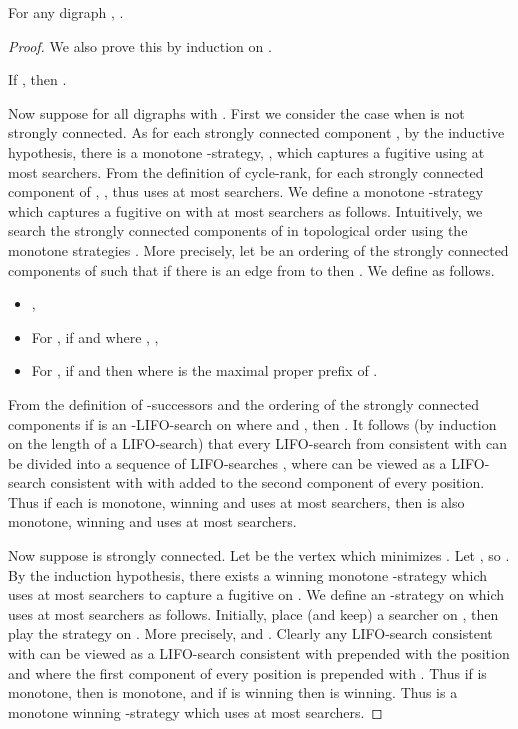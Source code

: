 \documentclass{llncs}
\begin{document}
\begin{lemma}  
For any digraph , .
\end{lemma}
\begin{proof}
We also prove this by induction on .

If , then .

Now suppose  for all digraphs  with .
First we consider the case when  is not strongly connected.  As  for each strongly connected component , by the inductive hypothesis,  there is a monotone -strategy, , which captures a fugitive using at most  searchers.  From the definition of cycle-rank, for each strongly connected component  of , , thus  uses at most  searchers.  We define a monotone -strategy which captures a fugitive on  with at most  searchers as follows.  Intuitively, we search the strongly connected components of  in topological order using the monotone strategies .  More precisely, let  be an ordering of the strongly connected components of  such that if there is an edge from  to  then .  We define  as follows.  
\begin{itemize}
	\item ,
	\item For , if  and  where , ,
	\item For , if  and  then  where  is the maximal proper prefix of .
\end{itemize}
From the definition of -successors and the ordering of the strongly connected components if  is an -LIFO-search on  where  and , then .  
It follows (by induction on the length of a LIFO-search) that every LIFO-search from  consistent with  can be divided into a sequence of LIFO-searches , where  can be viewed as a LIFO-search consistent with  with  added to the second component of every position.
Thus if each  is monotone, winning and uses at most  searchers, then  is also monotone, winning and uses at most  searchers.

Now suppose  is strongly connected.  Let  be the vertex which minimizes .  Let , so . By the induction hypothesis, there exists a winning monotone -strategy  which uses at most  searchers to capture a fugitive on .  We define an -strategy  on  which uses at most  searchers as follows.  Initially, place (and keep) a searcher on , then play the strategy  on .  More precisely,  and .  Clearly any LIFO-search consistent with  can be viewed as a LIFO-search consistent with  prepended with the position  and where the first component of every position is prepended with .  Thus if  is monotone, then  is monotone, and if  is winning then  is winning.  Thus  is a monotone winning -strategy which uses at most  searchers.
\end{proof}
\end{document}
